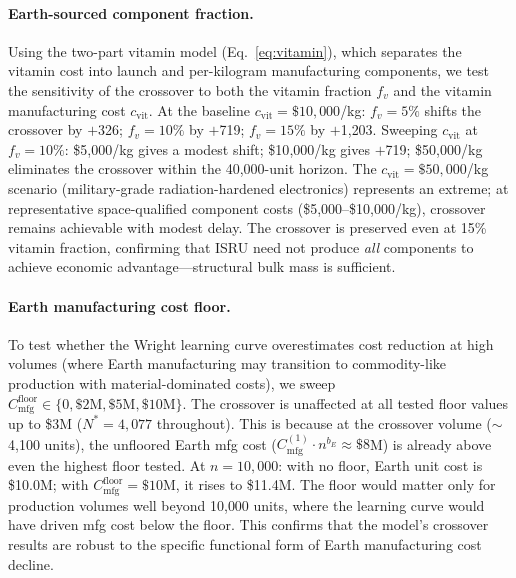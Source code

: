 \documentclass[preprint,12pt]{elsarticle}
\begin{document}
\paragraph{Earth-sourced component fraction.} Using the two-part vitamin model (Eq.~\ref{eq:vitamin}), which separates the vitamin cost into launch and per-kilogram manufacturing components, we test the sensitivity of the crossover to both the vitamin fraction $f_v$ and the vitamin manufacturing cost $c_{\mathrm{vit}}$. At the baseline $c_{\mathrm{vit}} = \$10{,}000$/kg: $f_v = 5\%$ shifts the crossover by $+$326; $f_v = 10\%$ by $+$719; $f_v = 15\%$ by $+$1{,}203. Sweeping $c_{\mathrm{vit}}$ at $f_v = 10\%$: \$5{,}000/kg gives a modest shift; \$10{,}000/kg gives $+$719; \$50{,}000/kg eliminates the crossover within the 40{,}000-unit horizon. The $c_{\mathrm{vit}} = \$50{,}000$/kg scenario (military-grade radiation-hardened electronics) represents an extreme; at representative space-qualified component costs (\$5{,}000--\$10{,}000/kg), crossover remains achievable with modest delay. The crossover is preserved even at 15\% vitamin fraction, confirming that ISRU need not produce \emph{all} components to achieve economic advantage---structural bulk mass is sufficient.

\paragraph{Earth manufacturing cost floor.} To test whether the Wright learning curve overestimates cost reduction at high volumes (where Earth manufacturing may transition to commodity-like production with material-dominated costs), we sweep $C_{\mathrm{mfg}}^{\mathrm{floor}} \in \{0, \$2\text{M}, \$5\text{M}, \$10\text{M}\}$. The crossover is unaffected at all tested floor values up to \$3M ($N^* = 4{,}077$ throughout). This is because at the crossover volume ($\sim$4{,}100 units), the unfloored Earth mfg cost ($C_{\mathrm{mfg}}^{(1)} \cdot n^{b_E} \approx \$8$M) is already above even the highest floor tested. At $n = 10{,}000$: with no floor, Earth unit cost is \$10.0M; with $C_{\mathrm{mfg}}^{\mathrm{floor}} = \$10$M, it rises to \$11.4M. The floor would matter only for production volumes well beyond 10{,}000 units, where the learning curve would have driven mfg cost below the floor. This confirms that the model's crossover results are robust to the specific functional form of Earth manufacturing cost decline.
\end{document}
